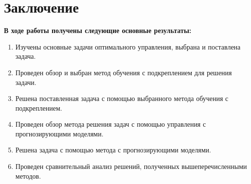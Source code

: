 \chapter*{Заключение}


\textbf{В ходе работы получены следующие основные результаты:}


\begin{enumerate}
	\item Изучены основные задачи оптимального управления, выбрана и поставлена задача.
	\item Проведен обзор и выбран метод обучения с подкреплением для решения задачи.
	\item Решена поставленная задача с помощью выбранного метода обучения с подкреплением.
	\item Проведен обзор метода решения задач с помощью управления с прогнозирующими моделями.
	\item Решена задача с помощью метода с прогнозирующими моделями.
	\item Проведен сравнительный анализ решений, полученных вышеперечисленными методов. 
\end{enumerate}
